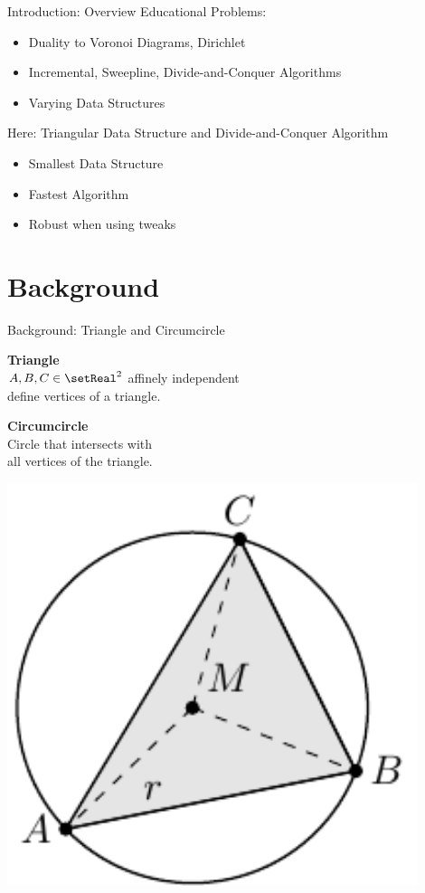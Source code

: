 \documentclass[aspectratio=169]{beamer}
\begin{document}
\begin{frame}{Introduction: Overview}
  Educational Problems:
  \begin{itemize}
    \item Duality to Voronoi Diagrams, Dirichlet
    \item Incremental, Sweepline, Divide-and-Conquer Algorithms
    \item Varying Data Structures
  \end{itemize}
  \bigskip
  Here: Triangular Data Structure and Divide-and-Conquer Algorithm
  \begin{itemize}
    \item Smallest Data Structure
    \item Fastest Algorithm
    \item Robust when using tweaks
  \end{itemize}
\end{frame}

\section{Background}
\begin{frame}{Background: Triangle and Circumcircle}
  \begin{minipage}[c]{0.45\textwidth}
    \textbf{Triangle} \\
    $A, B, C \in \setReal^2$ affinely independent \\
    define vertices of a triangle.

    \bigskip

    \textbf{Circumcircle}\\
    Circle that intersects with \\
    all vertices of the triangle.
  \end{minipage}
  \hfill
  \begin{minipage}[c]{0.49\textwidth}
    \centering
    \includegraphics[width=0.9\textwidth]{figures/triangle-circumcirle.pdf}
  \end{minipage}
\end{frame}
\end{document}
